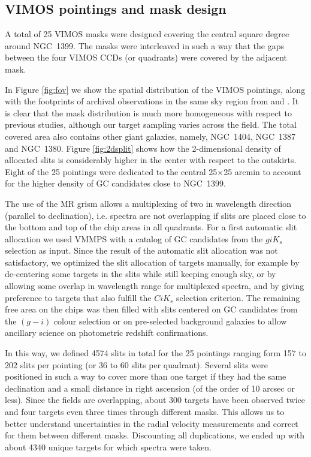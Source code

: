 \documentclass[useAMS,usenatbib]{mn2e}
\begin{document}
\subsection{VIMOS pointings and mask design}
\label{sec:VIMOSpointings}

A total of 25 VIMOS masks were designed covering the central square degree 
around NGC~1399. The masks were interleaved in such a way that the gaps between 
the four VIMOS CCDs (or quadrants) were covered by the adjacent mask. 

In Figure \ref{fig:fov} we show the spatial distribution of the VIMOS 
pointings, along with the footprints of archival observations in the same sky 
region from \citet{Schuberth} and \citet{Bergond07}. It is clear that the mask 
distribution is much more homogeneous with respect to previous studies, 
although our target sampling varies across the field. The total covered area 
also contains other giant galaxies, namely, NGC~1404, NGC~1387 and NGC~1380.  
Figure \ref{fig:2dsplit} shows how the 2-dimensional density of allocated slits 
is considerably higher in the center with respect to the outskirts. Eight of 
the 25 pointings were dedicated to the central 25$\times$25 arcmin to account 
for the higher density of GC candidates close to NGC~1399. 

The use of the MR grism allows a multiplexing of two in wavelength direction 
(parallel to declination), i.e. spectra are not overlapping if slits are placed 
close to the bottom and top of the chip areas in all quadrants. 
For a first automatic slit allocation we used VMMPS with a catalog of GC 
candidates from the $giK_s$ selection as input. Since the result of the 
automatic slit allocation was not satisfactory, we optimized the slit 
allocation of targets manually, for example by de-centering some targets in the 
slits while still keeping enough sky, or by allowing some overlap in wavelength 
range for multiplexed spectra, and by giving preference to targets that also 
fulfill the $CiK_s$ selection criterion. The remaining free area on the chips 
was then filled with slits centered on GC candidates from the $(g-i)$ colour 
selection or on pre-selected background galaxies to allow ancillary science on 
photometric redshift confirmations.

In this way, we defined 4574 slits in total for the 25 pointings ranging form 
157 to 202 slits per pointing (or 36 to 60 slits per quadrant). Several slits 
were positioned in such a way to cover more than one target if they had the 
same declination and a small distance in right ascension (of the order of 
10 arcsec or less). Since the 
fields are overlapping, about 300 targets have been observed twice and four 
targets even three times through different masks. This allows us to better 
understand uncertainties in the radial velocity measurements and correct 
for them between different masks. Discounting all duplications, we ended up 
with about 4340 unique targets for which spectra were taken. 
\end{document}
